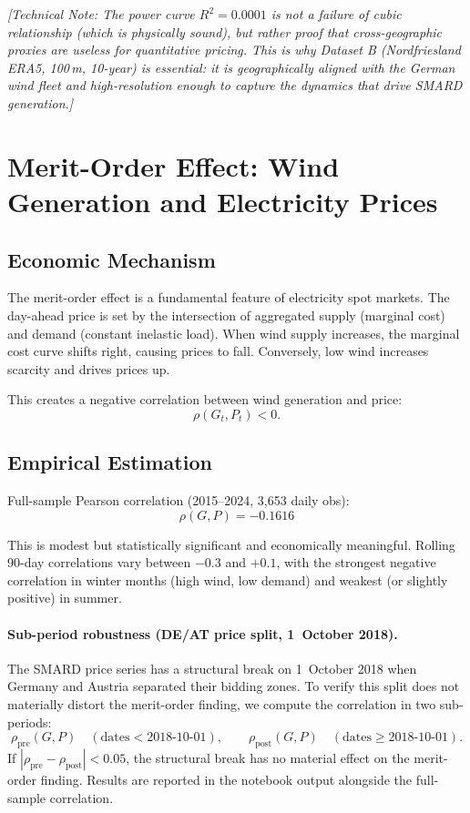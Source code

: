 \documentclass[11pt, a4paper, twoside]{article}
\begin{document}
\textit{[Technical Note: The power curve $R^2 = 0.0001$ is not a failure of cubic relationship (which is physically sound), but rather proof that cross-geographic proxies are useless for quantitative pricing. This is why Dataset B (Nordfriesland ERA5, 100\,m, 10-year) is essential: it is geographically aligned with the German wind fleet and high-resolution enough to capture the dynamics that drive SMARD generation.]}

\section{Merit-Order Effect: Wind Generation and Electricity Prices}

\subsection{Economic Mechanism}

The merit-order effect is a fundamental feature of electricity spot markets. The day-ahead price is set by the intersection of aggregated supply (marginal cost) and demand (constant inelastic load). When wind supply increases, the marginal cost curve shifts right, causing prices to fall. Conversely, low wind increases scarcity and drives prices up.

This creates a negative correlation between wind generation and price:
\begin{equation}
\rho(G_t, P_t) < 0.
\end{equation}

\subsection{Empirical Estimation}

Full-sample Pearson correlation (2015--2024, 3,653 daily obs):
\begin{equation}
\rho(G, P) = -0.1616
\end{equation}

This is modest but statistically significant and economically meaningful. Rolling 90-day correlations vary between $-0.3$ and $+0.1$, with the strongest negative correlation in winter months (high wind, low demand) and weakest (or slightly positive) in summer.

\paragraph{Sub-period robustness (DE/AT price split, 1~October 2018).}
The SMARD price series has a structural break on 1~October 2018 when Germany and Austria separated their bidding zones. To verify this split does not materially distort the merit-order finding, we compute the correlation in two sub-periods:
\begin{equation}
  \rho_{\text{pre}}(G,P) \quad (\text{dates} < \text{2018-10-01}), \qquad
  \rho_{\text{post}}(G,P) \quad (\text{dates} \geq \text{2018-10-01}).
\end{equation}
If $|\rho_{\text{pre}} - \rho_{\text{post}}| < 0.05$, the structural break has no material effect on the merit-order finding. Results are reported in the notebook output alongside the full-sample correlation.
\end{document}
